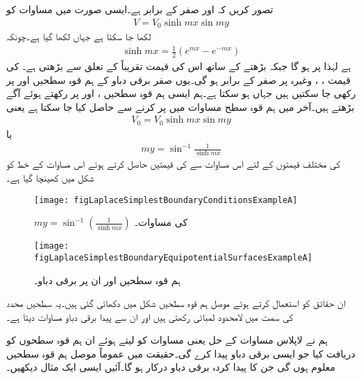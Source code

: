 تصور کریں کہ  اور  صفر کے برابر ہے۔ایسی صورت میں مساوات  کو
\begin{align}\label{مساوات_لاپلاس_اندازہ_ث}
V=V_0 \sinh mx \sin my
\end{align}
لکھا جا سکتا ہے جہاں  لکھا گیا ہے۔چونکہ
\begin{align*}
\sinh mx = \frac{1}{2}\left(e^{mx}-e^{-mx} \right)
\end{align*}
ہے لہٰذا  پر  ہو گا جبکہ بڑھتے  کے ساتھ اس کی قیمت تقریباً  کے تعلق سے بڑھتی ہے۔ کی قیمت ، ،  وغیرہ پر صفر کے برابر ہو گی۔یوں صفر برقی دباو کے ہم قوہ سطحیں  اور   پر رکھی جا سکتیں ہیں جہاں  ہو سکتا ہے۔ہم ایسی ہم قوہ سطحیں ،  اور
   پر رکھتے ہوئے آگے بڑھتے ہیں۔آخر میں  ہم قوہ سطح مساوات  میں  پر کرنے سے حاصل کیا جا سکتا ہے یعنی
\begin{align*}
V_0=V_0 \sinh mx \sin my
\end{align*}
یا 
\begin{align*}
my = \sin^{-1} \frac{1}{\sinh mx}
\end{align*}
 کی مختلف قیمتوں کے لئے اس مساوات سے  کی قیمتیں حاصل کرتے ہوئے اس مساوات کے خط کو شکل  میں کھینچا گیا ہے۔
\begin{figure}
\centering
\texttt{[image: figLaplaceSimplestBoundaryConditionsExampleA]}
\caption{$my=\sin^{-1} \left(\tfrac{1}{\sinh mx}\right)$ کی مساوات۔}
\label{شکل_لاپلاس_سرحدی_شرائط_الف}
\end{figure}
%
\begin{figure}
\centering
\texttt{[image: figLaplaceSimplestBoundaryEquipotentialSurfacesExampleA]}
\caption{ہم قوہ سطحیں اور ان پر برقی دباو۔}
\label{شکل_لاپلاس_سرحدی_شرائط_ہم_قوہ_سطحیں_الف}
\end{figure}

ان حقائق کو استعمال کرتے ہوئے موصل ہم قوہ سطحیں شکل  میں دکھائی گئی ہیں۔یہ سطحیں  محدد کی سمت میں لامحدود لمبائی رکھتی ہیں اور ان سے پیدا برقی دباو مساوات  دیتا ہے۔

ہم نے لاپلاس مساوات کے حل یعنی مساوات  کو لیتے ہوئے ان ہم قوہ سطحوں کو دریافت کیا جو ایسی برقی دباو پیدا کرے گی۔حقیقت میں عموماً موصل ہم قوہ سطحیں معلوم ہوں گی جن کا پیدا کردہ برقی دباو درکار ہو گا۔آئیں ایسی ایک مثال دیکھیں۔

